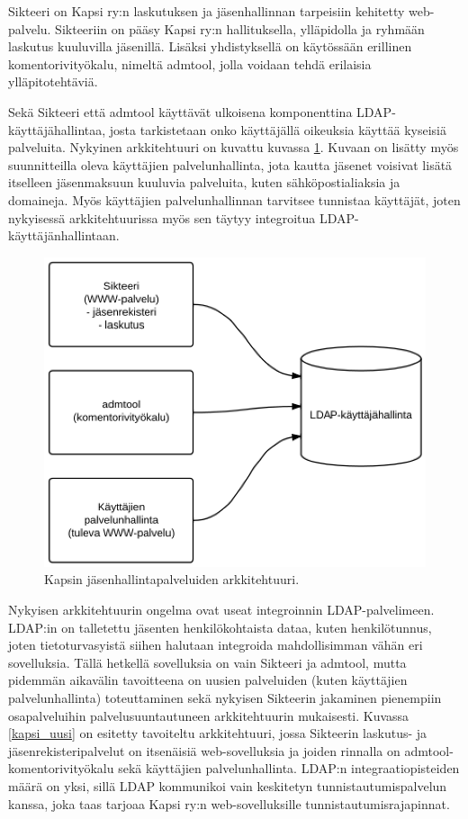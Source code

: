 Sikteeri on Kapsi ry:n laskutuksen ja jäsenhallinnan tarpeisiin kehitetty web-palvelu. Sikteeriin on pääsy Kapsi ry:n hallituksella, ylläpidolla ja ryhmään laskutus kuuluvilla jäsenillä. Lisäksi yhdistyksellä on käytössään erillinen komentorivityökalu, nimeltä admtool, jolla voidaan tehdä erilaisia ylläpitotehtäviä.

Sekä Sikteeri että admtool käyttävät ulkoisena komponenttina LDAP-käyttäjähallintaa, josta tarkistetaan onko käyttäjällä oikeuksia käyttää kyseisiä palveluita. Nykyinen arkkitehtuuri on kuvattu kuvassa \ref{kapsi_nykyinen}. Kuvaan on lisätty myös suunnitteilla oleva käyttäjien palvelunhallinta, jota kautta jäsenet voisivat lisätä itselleen jäsenmaksuun kuuluvia palveluita, kuten sähköpostialiaksia ja domaineja. Myös käyttäjien palvelunhallinnan tarvitsee tunnistaa käyttäjät, joten nykyisessä arkkitehtuurissa myös sen täytyy integroitua LDAP-käyttäjänhallintaan.

\begin{figure}[h]
\centering
\includegraphics[width=.7\textwidth]{toteutus/kapsi_nykyinen.eps}
\caption{Kapsin jäsenhallintapalveluiden arkkitehtuuri.}%
\label{kapsi_nykyinen}
\end{figure}

Nykyisen arkkitehtuurin ongelma ovat useat integroinnin LDAP-palvelimeen. LDAP:in on talletettu jäsenten henkilökohtaista dataa, kuten henkilötunnus, joten tietoturvasyistä siihen halutaan integroida mahdollisimman vähän eri sovelluksia. Tällä hetkellä sovelluksia on vain Sikteeri ja admtool, mutta pidemmän aikavälin tavoitteena on uusien palveluiden (kuten käyttäjien palvelunhallinta) toteuttaminen sekä nykyisen Sikteerin jakaminen pienempiin osapalveluihin palvelusuuntautuneen arkkitehtuurin mukaisesti. Kuvassa \ref{kapsi_uusi} on esitetty tavoiteltu arkkitehtuuri, jossa Sikteerin laskutus- ja jäsenrekisteripalvelut on itsenäisiä web-sovelluksia ja joiden rinnalla on admtool-komentorivityökalu sekä käyttäjien palvelunhallinta. LDAP:n integraatiopisteiden määrä on yksi, sillä LDAP kommunikoi vain keskitetyn tunnistautumispalvelun kanssa, joka taas tarjoaa Kapsi ry:n web-sovelluksille tunnistautumisrajapinnat.

